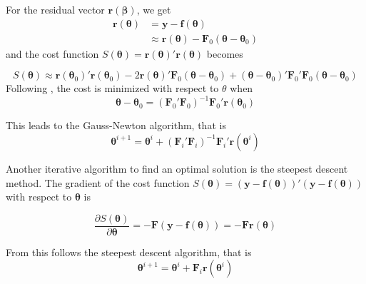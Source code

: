 For the residual vector $\mathbf{r}(\boldsymbol{\beta})$, we get
\begin{align}
\mathbf{r}(\boldsymbol{\theta}) 
&= \mathbf{y} - \mathbf{f}(\boldsymbol{\theta}) \nonumber\\
&\approx \mathbf{r}(\boldsymbol{\theta}) - \mathbf{F}_0(\boldsymbol{\theta} - \boldsymbol{\theta}_0)
\end{align}
and the cost function 
$S(\boldsymbol{\theta}) = \mathbf{r}(\boldsymbol{\theta})' \mathbf{r}(\boldsymbol{\theta})$
becomes

\begin{equation}
S(\boldsymbol{\theta}) \approx
\mathbf{r}(\boldsymbol{\theta}_0)' \mathbf{r}(\boldsymbol{\theta}_0) -
2 \mathbf{r}(\boldsymbol{\theta}) ' \mathbf{F}_0(\boldsymbol{\theta} - \boldsymbol{\theta}_0) + 
(\boldsymbol{\theta} - \boldsymbol{\theta}_0)'
\mathbf{F}_0' \mathbf{F}_0
(\boldsymbol{\theta} - \boldsymbol{\theta}_0)
\end{equation}
Following \citet[chap. 2]{Seber}, the cost is minimized with respect to $\theta$ when
\begin{equation}
\boldsymbol{\theta} - \boldsymbol{\theta}_0 = 
(\mathbf{F}_0' \mathbf{F}_0)^{-1} \mathbf{F}_0' \mathbf{r}(\boldsymbol{\theta}_0)
\end{equation}

This leads to the Gauss-Newton algorithm, that is
\begin{equation}
\boldsymbol{\theta}^{i+1} =
\boldsymbol{\theta}^{i} + 
(\mathbf{F}_i' \mathbf{F}_i)^{-1} \mathbf{F}_i' \mathbf{r}(\boldsymbol{\theta}^{i})
\end{equation}

Another iterative algorithm to find an optimal solution is the steepest descent method.
The gradient of the cost function 
$S(\boldsymbol{\theta}) = ( \mathbf{y} - \mathbf{f}(\boldsymbol{\theta}) )'
( \mathbf{y} - \mathbf{f}(\boldsymbol{\theta}) )$
with respect to $\boldsymbol{\theta}$ is

\begin{equation}
\frac{\partial S(\boldsymbol{\theta})}{\partial \boldsymbol{\theta}} = 
- \mathbf{F} ( \mathbf{y} - \mathbf{f}(\boldsymbol{\theta}) ) = 
- \mathbf{F}  \mathbf{r}(\boldsymbol{\theta}) 
\end{equation}

From this follows the steepest descent algorithm, that is
\begin{equation}
\boldsymbol{\theta}^{i+1} =
\boldsymbol{\theta}^{i} +
\mathbf{F}_i \mathbf{r}(\boldsymbol{\theta}^{i})
\end{equation}

